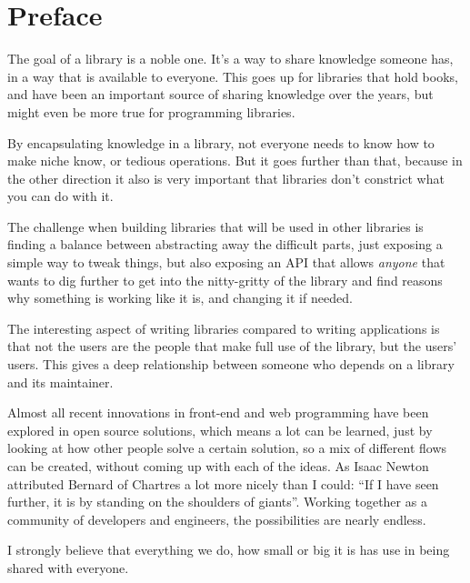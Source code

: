 
\chapter{Preface}%
\label{chp:preface}

The goal of a \gls{library} is a noble one. It's a way to share knowledge someone has, in a way that is available to everyone. This goes up for libraries that hold books, and have been an important source of sharing knowledge over the years, but might even be more true for programming libraries. 

By encapsulating knowledge in a \gls{library}, not everyone needs to know how to make niche know, or tedious operations. But it goes further than that, because in the other direction it also is very important that libraries don't constrict what you can do with it.

The challenge when building libraries that will be used in other libraries is finding a balance between abstracting away the difficult parts, just exposing a simple way to tweak things, but also exposing an API that allows \emph{anyone} that wants to dig further to get into the nitty-gritty of the \gls{library} and find reasons why something is working like it is, and changing it if needed.

The interesting aspect of writing libraries compared to writing applications is that not the users are the people that make full use of the \gls{library}, but the users' users. This gives a deep relationship between someone who depends on a \gls{library} and its maintainer.

Almost all recent innovations in front-end and web programming have been explored in open source solutions, which means a lot can be learned, just by looking at how other people solve a certain solution, so a mix of different flows can be created, without coming up with each of the ideas. As Isaac Newton attributed\cite{newton-giants} Bernard of Chartres\cite{quote-giants-source} a lot more nicely than I could: ``If I have seen further, it is by standing on the shoulders of giants''. Working together as a community of developers and engineers, the possibilities are nearly endless.

I strongly believe that everything we do, how small or big it is has use in being shared with everyone.
